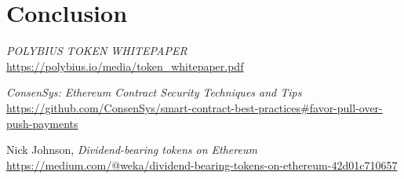 \documentclass[onecolumn]{article}
\begin{document}
\section{Conclusion}

\begin{thebibliography}{3}

	\emph{POLYBIUS TOKEN WHITEPAPER}\newline
	\url{https://polybius.io/media/token_whitepaper.pdf}

	\emph{ConsenSys: Ethereum Contract Security Techniques and Tips}\newline
	\url{https://github.com/ConsenSys/smart-contract-best-practices#favor-pull-over-push-payments}

	Nick Johnson,
	\emph{Dividend-bearing tokens on Ethereum}\newline
	\url{https://medium.com/@weka/dividend-bearing-tokens-on-ethereum-42d01c710657}

\end{thebibliography}
\end{document}

